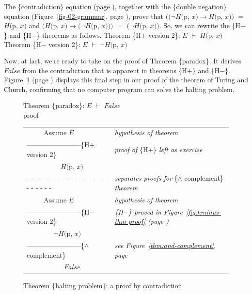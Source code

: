The \{contradiction\} equation (page \pageref{boolean-contradiction}),
together with the \{double negation\} equation
(Figure~\ref{fig-02-grammar}, page \pageref{fig-02-grammar}),
prove that
$((\neg H($\textsf{p}, $x) \rightarrow H($\textsf{p}, $x))$ $=$ $H($\textsf{p}, $x)$
and
$(H($\textsf{p}, $x) \rightarrow (\neg H($\textsf{p}, $x)))$ $=$ $(\neg H($\textsf{p}, $x))$.
So, we can rewrite the \{H$+$\} and \{H$-$\} theorems as follows.
\vspace{2mm}
\label{thm:HplusHminus}
\hspace*{5mm}Theorem \{H$+$ version 2\}: $E$ $\vdash$ $H($\textsf{p}, $x)$ \\
\hspace*{5mm}Theorem \{H$-$ version 2\}: $E$ $\vdash$ $\neg H($\textsf{p}, $x)$
\vspace{2mm}

Now, at last, we're ready to take on
the proof of Theorem \{paradox\}.
It derives $False$ from the contradiction that is apparent
in theorems \{H$+$\} and \{H$-$\}.
Figure~\ref{fig:proof-paradox-thm} (page \pageref{fig:proof-paradox-thm})
displays this final step in our proof
of the theorem of Turing and Church,
confirming that no computer program can solve the halting problem.

\begin{figure}
Theorem \{paradox\}: $E$ $\vdash$ $False$\\
proof
\begin{center}
\begin{tabular}{ll}
~~~~~Assume $E$                                 &\emph{hypothesis of theorem}\\
------------------------\{H$+$ version 2\}      &\emph{proof of} \{H$+$\} \emph{left as exercise}\\
~~~~~~~~~~$H($\textsf{p}, $x)$                  &\\
 - - - - - - - - - - - - - - - - - - - - - - - -&\emph{separates proofs for} \{$\wedge$ complement\} \emph{theorem}\\
~~~~~Assume $E$                                 &\emph{hypothesis of theorem}\\
------------------------\{H$-$ version 2\}      &\emph{\{H$-$\} proved in Figure~\ref{fig:hminus-thm-proof} (page \pageref{fig:hminus-thm-proof})}\\
~~~~~~~~$\neg H($\textsf{p}, $x)$               &\\
------------------------\{$\wedge$ complement\} &\emph{see Figure~\ref{thm:and-complement}, page \pageref{thm:and-complement}}\\
~~~~~~~~~~~$False$                              &\\
\end{tabular}
\end{center}
\caption{Theorem \{halting problem\}: a proof by contradiction}
\label{fig:proof-paradox-thm}
\end{figure}

